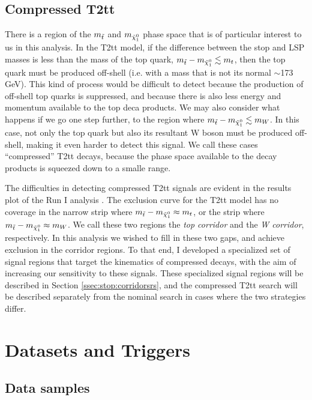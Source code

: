 
\subsection{Compressed T2tt}
\label{ssec:stop:sigcompressed}

There is a region of the $m_{\tilde{t}}$ and $m_{\tilde{\chi}^0_1}$ phase space
that is of particular interest to us in this analysis. In the T2tt
model, if the difference between the stop and LSP masses is less than
the mass of the top quark, $m_{\tilde{t}} - m_{\tilde{\chi}^0_1} \lesssim m_t$, then the top quark
must be produced off-shell (i.e. with a mass that is not its normal
$\sim$173 GeV). This kind of process would be difficult to detect
because the production of off-shell top quarks is suppressed, and
because there is also less energy and momentum available to the top
deca products. We may also consider what happens if we go one step
further, to the region where $m_{\tilde{t}} - m_{\tilde{\chi}^0_1} \lesssim m_W$. In this case, not
only the top quark but also its resultant W boson must be produced
off-shell, making it even harder to detect this signal. We call these
cases ``compressed'' T2tt decays, because the phase space available to
the decay products is squeezed down to a smalle range.

The difficulties in detecting compressed T2tt signals are evident in
the results plot of the Run I analysis \cite{stop1l8tev}. The exclusion
curve for the T2tt model has no coverage in the narrow strip where
$m_{\tilde{t}} - m_{\tilde{\chi}^0_1} \approx m_t$, or the strip where $m_{\tilde{t}} - m_{\tilde{\chi}^0_1}
\approx m_W$. We call these two regions the \emph{top corridor} and
the \emph{W corridor}, respectively. In this analysis we wished to
fill in these two gaps, and achieve exclusion in the corridor
regions. To that end, I developed a specialized set of
signal regions that target the kinematics of compressed decays, with
the aim of increasing our sensitivity to these signals. These
specialized signal regions will be described in Section
\ref{ssec:stop:corridorsrs}, and the compressed T2tt search will be
described separately from the nominal search in cases where
the two strategies differ.

\section{Datasets and Triggers}
\label{sec:stop:datatrig}

\subsection{Data samples}
\label{ssec:stop:datasamples}

